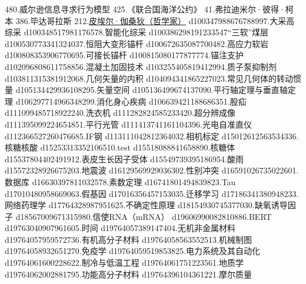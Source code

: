 480.威尔逊信息寻求行为模型
425.《联合国海洋公约》
41.弗拉迪米尔·彼得·柯本
386.毕达哥拉斯
212.\href{https://wuli.wiki/assets/sogou/212.\%E7\%9A\%AE\%E5\%9F\%83\%E5\%B0\%94\%C2\%B7\%E4\%BC\%BD\%E6\%A1\%91\%E7\%8B\%84\%20-\%20\%E6\%90\%9C\%E7\%8B\%97\%E7\%A7\%91\%E5\%AD\%A6\%E7\%99\%BE\%E7\%A7\%91.html}{皮埃尔·伽桑狄（哲学家）}
d100347988676788997.大采高综采
d100348517981176578.智能化综采
d100386298191233547“三软”煤层
d100530773341324037.恒阻大变形锚杆
d100672635087700482.高应力软岩
d100808353906770695.可接长锚杆
d100815080177877774.锚注支护
d102096808611758856.混凝土加固技术
d103255405819412994.质子泵抑制剂
d103811315381912068.几何矢量的内积
d104094341865227023.常见几何体的转动惯量
d105134429936108295.矢量空间
d105136499674137090.平行轴定理与垂直轴定理
d106297714966348299.消化身心疾病
d106639421188686351.股疝
d111099485718922240.洗衣机
d111282824585233420.超分辨成像
d111395099224654851.平行光管
d111413741161104396.光电自准直仪
d112366527260476685.IF钢
d113111042812364032.相机标定
d15012612563534336.核糖核酸
d15253313352106510.test
d15518088841658890.核糖体
d15537804402491912.表皮生长因子受体
d15549739395186954.酸雨
d15572328926675203.地震波
d16129569929036302.性别冲突
d16591026735022601.数据库
d16630397811032578.素数定理
d16741801494839823.Tau
d17010480958669063.假基因
d17016356457153035.迁移学习
d17186341380948233.网络药理学
d17764328987951625.不确定性原理
d18154930745377030.缺氧诱导因子
d18567009671315980.信使RNA（mRNA）
d19606990082810886.BERT
d19763040907961605.时间
d19764057389147404.无机非金属材料
d19764057959572736.有机高分子材料
d19764058563552513.机械制图
d19764058932651270.免疫学
d19764059519853825.电力系统及其自动化
d19764061600228622.制冷与低温工程
d19764061751223561.地质学
d19764062002881795.功能高分子材料
d19764396104361221.摩尔质量